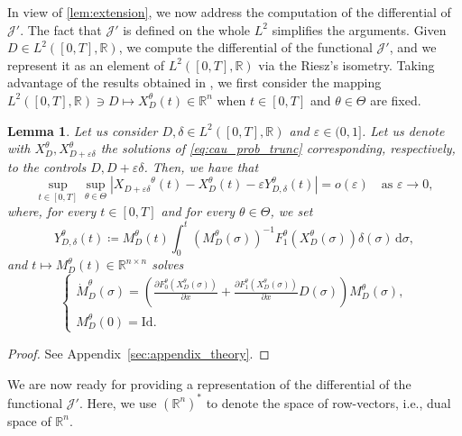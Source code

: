 \documentclass[a4paper,12pt, reqno]{amsart}
\theoremstyle{plain}
\newtheorem{lemma}[theorem]{Lemma}
\theoremstyle{definition}
\theoremstyle{remark}
\numberwithin{equation}{section}
\newcommand{\J}{\mathcal{J}}
\newcommand{\R}{\mathbb{R}}
\newcommand{\e}{\varepsilon}
\newcommand{\de}{\,\mathrm{d}}
\begin{document}
In view of \cref{lem:extension}, we now address the computation of the differential of $\J'$. 
The fact that $\J'$ is defined on the whole $L^2$ simplifies the arguments.
Given ${D} \in L^2([0,T],\R)$, we compute the differential of the functional $\J'$, and we represent it as an element of $L^2([0,T],\R)$ via the Riesz's isometry. 
Taking advantage of the results obtained in \cite{scag23gf}, we first consider the mapping $L^2([0,T],\R) \ni {D}\mapsto {X_D^\theta}(t) \in \R^n$ when ${t} \in [0,T]$ and $\theta\in\Theta$ are fixed. 

\begin{lemma} \label{lem:diff_traj}
    Let us consider ${D,\delta} \in L^2([0,T],\R)$ and $\e\in (0,1]$. Let us denote with ${X_D^\theta}, {X_{D+\e \delta}^\theta}$ the solutions of \cref{eq:cau_prob_trunc} corresponding, respectively, to the controls ${D, D+ \e\delta}$.
    Then, we have that
    \begin{equation}\label{eq:1st_ord_traj}
        \sup_{{t}\in [0,T]} \sup_{\theta\in \Theta}
        | {X_{D+\e \delta}}^\theta ({t}) - {X_D^\theta} ({t}) - \e {Y_{D, \delta}^\theta} ({t})
        | = o(\e) \quad \mbox{as } \e\to 0,
    \end{equation}
    where, for every ${t}\in[0,T]$ and for every $\theta\in\Theta$, we set
    \begin{equation} \label{eq:def_var_traj}
       {Y_{D, \delta}^\theta} ({t}) \coloneqq 
        M_{D}^\theta({t}) 
    \int_0^{t} 
    \left(M_{D}^{\theta}(\sigma) \right)^{-1}
    F_1^\theta \left( {X_D^\theta}(\sigma) \right) {\delta}(\sigma) 
    \de \sigma,
    \end{equation}
    and ${t}\mapsto M_{D}^\theta({t})\in \R^{{n}\times {n}}$ solves
    \begin{equation*}
        \begin{cases}
            \dot M_{D}^\theta(\sigma) =
            \left( \frac{\partial F_0^\theta ({X_D^\theta}(\sigma))}{\partial x} +
    \frac{\partial F_1^\theta ({X_D^\theta}(\sigma))}{\partial x} {D}(\sigma) \right) M_{D}^\theta(\sigma), \\
    M_{D}^\theta(0) = \mathrm{Id}.
        \end{cases}
    \end{equation*}
\end{lemma}
\begin{proof}
    See {Appendix}~\ref{sec:appendix_theory}.
\end{proof}


We are now ready for providing a representation of the differential of the functional $\J'$. {Here, we use $(\R^n)^*$ to denote the space of row-vectors, i.e., dual space of $\R^n$.}
\end{document}
